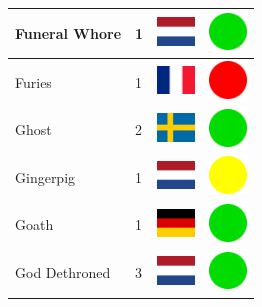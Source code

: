 \documentclass[12pt, a4paper, twoside]{report}
\begin{document}
\begin{center}
\begin{longtable}{|p{5cm}|p{2cm}|p{2cm}|p{2cm}|}
			Funeral Whore & 1 & \includegraphics[width=1cm]{4x3/nl} & \includegraphics[width=1cm]{likes/y} \\ \hline
			Furies & 1 & \includegraphics[width=1cm]{4x3/fr} & \includegraphics[width=1cm]{likes/n} \\ \hline
			Ghost & 2 & \includegraphics[width=1cm]{4x3/se} & \includegraphics[width=1cm]{likes/y} \\ \hline
			Gingerpig & 1 & \includegraphics[width=1cm]{4x3/nl} & \includegraphics[width=1cm]{likes/m} \\ \hline
			Goath & 1 & \includegraphics[width=1cm]{4x3/de} & \includegraphics[width=1cm]{likes/y} \\ \hline
			God Dethroned & 3 & \includegraphics[width=1cm]{4x3/nl} & \includegraphics[width=1cm]{likes/y} \\ \hline

\end{longtable}
\end{center}
\end{document}
